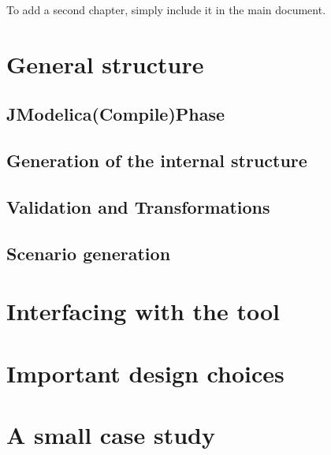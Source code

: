 To add a second chapter, simply include it in the main document.

\section{General structure}
\subsection{JModelica(Compile)Phase}
\subsection{Generation of the internal structure}
\subsection{Validation and Transformations}
\subsection{Scenario generation}

\section{Interfacing with the tool}
\section{Important design choices}
\section{A small case study}